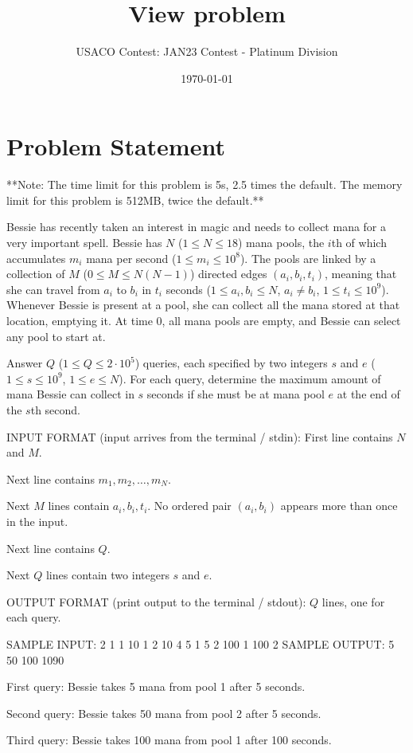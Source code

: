 \documentclass[12pt]{article}
\title{View problem}
\author{USACO Contest: JAN23 Contest - Platinum Division}
\date{\today}
\begin{document}
\maketitle

\section*{Problem Statement}


**Note: The time limit for this problem is 5s, 2.5 times the default. The memory limit for this problem is 512MB, twice the default.**

Bessie has recently taken an interest in magic and needs to collect mana for a
very important spell. Bessie has $N$ ($1\le N\le 18$) mana pools, the $i$th of
which accumulates $m_i$ mana per second ($1\le m_i\le 10^8$). The pools are
linked by a collection of $M$  ($0\le M\le N(N-1)$) directed edges
$(a_i,b_i,t_i)$, meaning that she can travel from $a_i$ to $b_i$ in $t_i$
seconds ($1\le a_i, b_i\le N$, $a_i\neq b_i$, $1\le t_i\le 10^9$). Whenever
Bessie is present at a pool, she can collect all the mana stored at that
location, emptying it. At time $0$, all mana pools are empty, and Bessie can
select any pool to start at.

Answer $Q$ ($1\le Q\le 2\cdot 10^5$) queries, each specified by two integers $s$
and $e$ ($1\le s\le 10^9$, $1\le e\le N$). For each query, determine the maximum
amount of mana Bessie can collect in $s$ seconds if she must be at mana pool $e$
at the end of the $s$th second.

INPUT FORMAT (input arrives from the terminal / stdin):
First line contains $N$ and $M$.

Next line contains $m_1,m_2,\dots, m_N$.

Next $M$ lines contain $a_i,b_i,t_i$. No ordered pair $(a_i,b_i)$ appears more
than once in the input.

Next line contains $Q$.

Next $Q$ lines contain two integers $s$ and $e$.

OUTPUT FORMAT (print output to the terminal / stdout):
$Q$ lines, one for each query.

SAMPLE INPUT:
2 1
1 10
1 2 10
4
5 1
5 2
100 1
100 2
SAMPLE OUTPUT: 
5
50
100
1090

First query: Bessie takes 5 mana from pool 1 after 5 seconds.

Second query: Bessie takes 50 mana from pool 2 after 5 seconds.

Third query: Bessie takes 100 mana from pool 1 after 100 seconds.
\end{document}
